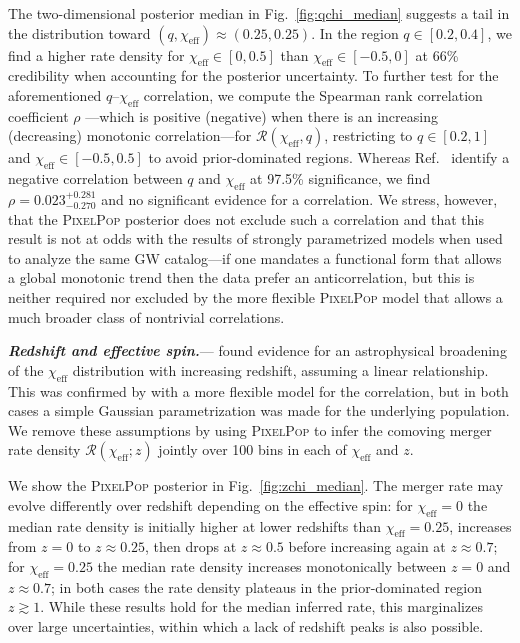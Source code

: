 \documentclass[%
 reprint,
 amsmath,amssymb,
 aps,
 prd,
 nofootinbib,nobibnotes,
]{revtex4-2}
\newcommand{\heading}[1]{\textbf{\textit{#1.}}}
\begin{document}
The two-dimensional posterior median in Fig.~\ref{fig:qchi_median} suggests a tail in the distribution toward $(q, \chi_\mathrm{eff}) \approx (0.25, 0.25)$. In the region $q \in [0.2, 0.4]$, we find a higher rate density for $\chi_\mathrm{eff} \in [0, 0.5]$ than $\chi_\mathrm{eff} \in [-0.5,0]$ at 66\% credibility when accounting for the posterior uncertainty. To further test for the aforementioned $q$--$\chi_\mathrm{eff}$ correlation, we compute the Spearman rank correlation coefficient $\rho$ \cite{Spearman:1904abc,kendall1979advanced}---which is positive (negative) when there is an increasing (decreasing) monotonic correlation---for $\mathcal{R}(\chi_\mathrm{eff},q)$, restricting to $q \in [0.2, 1]$ and $\chi_\mathrm{eff} \in [-0.5,0.5]$ to avoid prior-dominated regions. Whereas Ref.~\cite{KAGRA:2021duu} identify a negative correlation between $q$ and $\chi_\mathrm{eff}$ at 97.5\% significance, we find $\rho = 0.023_{-0.270}^{+0.281}$ and no significant evidence for a correlation. We stress, however, that the \textsc{PixelPop} posterior does not exclude such a correlation and that this result is not at odds with the results of strongly parametrized models \cite{Callister:2021fpo, KAGRA:2021duu, Adamcewicz:2022hce, Heinzel:2023hlb} when used to analyze the same GW catalog---if one mandates a functional form that allows a global monotonic trend then the data prefer an anticorrelation, but this is neither required nor excluded by the more flexible \textsc{PixelPop} model that allows a much broader class of nontrivial correlations.

\heading{Redshift and effective spin}---\citeauthor{Biscoveanu:2022qac} \cite{Biscoveanu:2022qac} found evidence for an astrophysical broadening of the $\chi_\mathrm{eff}$ distribution with increasing redshift, assuming a linear relationship. This was confirmed by \citeauthor{Heinzel:2023hlb} \cite{Heinzel:2023hlb} with a more flexible model for the correlation, but in both cases a simple Gaussian parametrization was made for the underlying population. We remove these assumptions by using \textsc{PixelPop} to infer the comoving merger rate density $\mathcal{R}(\chi_\mathrm{eff};z)$ jointly over 100 bins in each of $\chi_\mathrm{eff}$ and $z$.

We show the \textsc{PixelPop} posterior in Fig.~\ref{fig:zchi_median}. The merger rate may evolve differently over redshift depending on the effective spin: for $\chi_\mathrm{eff}=0$ the median rate density is initially higher at lower redshifts than $\chi_\mathrm{eff}=0.25$, increases from $z=0$ to $z\approx0.25$, then drops at $z\approx0.5$ before increasing again at $z\approx0.7$; for $\chi_\mathrm{eff}=0.25$ the median rate density increases monotonically between $z=0$ and $z\approx0.7$; in both cases the rate density plateaus in the prior-dominated region $z\gtrsim1$. While these results hold for the median inferred rate, this marginalizes over large uncertainties, within which a lack of redshift peaks is also possible.
\end{document}

